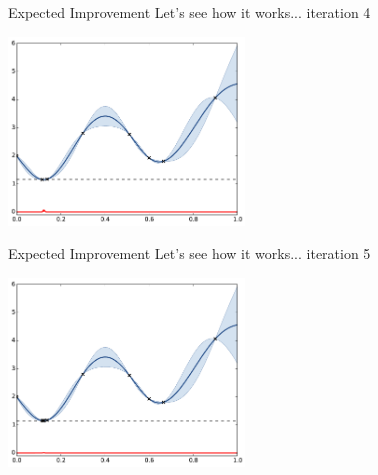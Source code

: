 \documentclass{beamer}
\begin{document}
\begin{frame}[noframenumbering]{Expected Improvement}
Let's see how it works... iteration 4
\begin{center}
\includegraphics[height=5cm]{figures/python/ego_EI4}
\end{center}
\end{frame}

\begin{frame}[noframenumbering]{Expected Improvement}
Let's see how it works... iteration 5
\begin{center}
\includegraphics[height=5cm]{figures/python/ego_EI9}
\end{center}
\end{frame}
\end{document}
